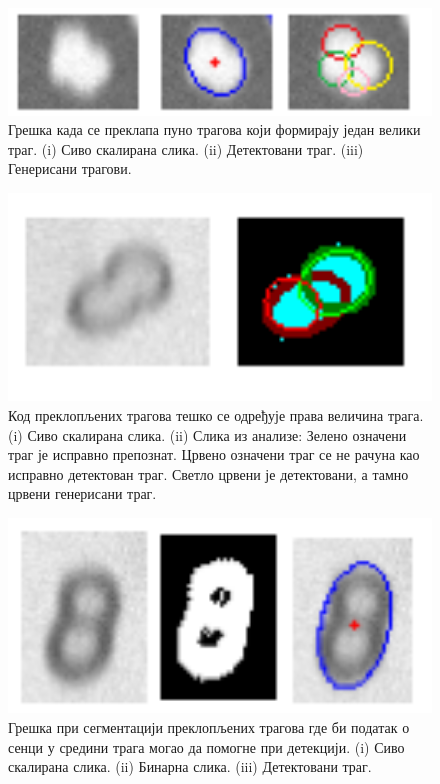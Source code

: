 \documentclass[11pt,a4paper,serbian,oneside]{book}
\begin{document}
\begin{figure}[H]
\begin{center}
\includegraphics[width=150mm]{images/multi.png}
\end{center}
\caption{Грешка када се преклапа пуно трагова који формирају један велики траг. (i) Сиво скалирана слика. (ii) Детектовани траг.  (iii) Генерисани трагови. }
\label{fig:multi}
\end{figure}

\begin{figure}[H]
\begin{center}
\includegraphics[width=150mm]{images/small.png}
\end{center}
\caption{Код преклопљених трагова тешко се одређује права величина трага. (i)  Сиво скалирана слика. (ii) Слика из анализе: Зелено означени траг је исправно препознат. Црвено означени траг се не рачуна као исправно детектован траг. Светло црвени је детектовани, а тамно црвени генерисани траг. }
\label{fig:small}
\end{figure}

\begin{figure}[H]
\begin{center}
\includegraphics[width=150mm]{images/shadow.png}
\end{center}
\caption{Грешка при сегментацији преклопљених трагова где би податак о сенци у средини трага могао да помогне при детекцији. (i) Сиво скалирана слика. (ii) Бинарна слика. (iii) Детектовани траг. }
\label{fig:shadow}
\end{figure}
\end{document}
